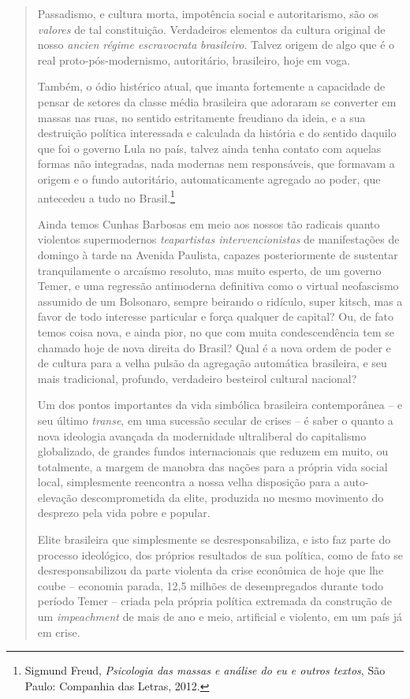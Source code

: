 \begin{quote}
Passadismo, e cultura morta, impotência social e autoritarismo, são os
\emph{valores} de tal constituição. Verdadeiros elementos da cultura
original de nosso \emph{ancien régime escravocrata} \emph{brasileiro}.
Talvez origem de algo que é o real proto-pós-modernismo, autoritário,
brasileiro, hoje em voga.

Também, o ódio histérico atual, que imanta fortemente a capacidade de
pensar de setores da classe média brasileira que adoraram se converter
em massas nas ruas, no sentido estritamente freudiano da ideia, e a sua
destruição política interessada e calculada da história e do sentido
daquilo que foi o governo Lula no país, talvez ainda tenha contato com
aquelas formas não integradas, nada modernas nem responsáveis, que
formavam a origem e o fundo autoritário, automaticamente agregado ao
poder, que antecedeu a tudo no Brasil.\footnote{Sigmund Freud,
  \emph{Psicologia das massas e análise do eu e outros textos}, São
  Paulo: Companhia das Letras, 2012.}

Ainda temos Cunhas Barbosas em meio aos nossos tão radicais quanto
violentos supermodernos \emph{teapartistas intervencionistas} de
manifestações de domingo à tarde na Avenida Paulista, capazes
posteriormente de sustentar tranquilamente o arcaísmo resoluto, mas
muito esperto, de um governo Temer, e uma regressão antimoderna
definitiva como o virtual neofascismo assumido de um Bolsonaro, sempre
beirando o ridículo, super kitsch, mas a favor de todo interesse
particular e força qualquer de capital? Ou, de fato temos coisa nova, e
ainda pior, no que com muita condescendência tem se chamado hoje de nova
direita do Brasil? Qual é a nova ordem de poder e de cultura para a
velha pulsão da agregação automática brasileira, e seu mais tradicional,
profundo, verdadeiro besteirol cultural nacional?

Um dos pontos importantes da vida simbólica brasileira contemporânea --
e seu último \emph{transe}, em uma sucessão secular de crises -- é saber
o quanto a nova ideologia avançada da modernidade ultraliberal do
capitalismo globalizado, de grandes fundos internacionais que reduzem em
muito, ou totalmente, a margem de manobra das nações para a própria vida
social local, simplesmente reencontra a nossa velha disposição para a
auto-elevação descomprometida da elite, produzida no mesmo movimento do
desprezo pela vida pobre e popular.

Elite brasileira que simplesmente se desresponsabiliza, e isto faz parte
do processo ideológico, dos próprios resultados de sua política, como de
fato se desresponsabilizou da parte violenta da crise econômica de hoje
que lhe coube -- economia parada, 12,5 milhões de desempregados durante
todo período Temer -- criada pela própria política extremada da
construção de um \emph{impeachment} de mais de ano e meio, artificial e
violento, em um país já em crise.


\end{quote}
